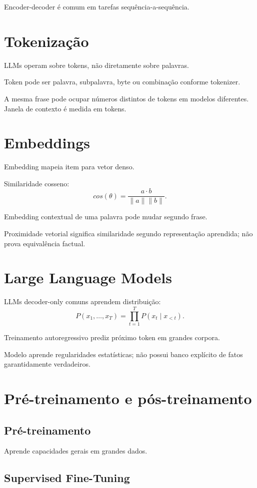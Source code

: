 Encoder-decoder é comum em tarefas sequência-a-sequência.

\section{Tokenização}

LLMs operam sobre tokens, não diretamente sobre palavras.

Token pode ser palavra, subpalavra, byte ou combinação conforme tokenizer.

A mesma frase pode ocupar números distintos de tokens em modelos diferentes. Janela de contexto é medida em tokens.

\section{Embeddings}

Embedding mapeia item para vetor denso.

Similaridade cosseno:
\[
cos(\theta)=\frac{a\cdot b}{\|a\|\|b\|}.
\]

Embedding contextual de uma palavra pode mudar segundo frase.

Proximidade vetorial significa similaridade segundo representação aprendida; não prova equivalência factual.

\section{Large Language Models}

LLMs decoder-only comuns aprendem distribuição:
\[
P(x_1,\ldots,x_T)=\prod_{t=1}^{T}P(x_t\mid x_{<t}).
\]

Treinamento autoregressivo prediz próximo token em grandes corpora.

Modelo aprende regularidades estatísticas; não possui banco explícito de fatos garantidamente verdadeiros.

\section{Pré-treinamento e pós-treinamento}

\subsection{Pré-treinamento}

Aprende capacidades gerais em grandes dados.

\subsection{Supervised Fine-Tuning}

